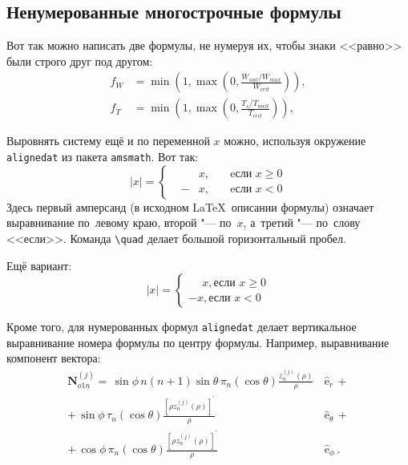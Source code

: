 \subsection{Ненумерованные многострочные формулы}\label{subsec:ch1/sec3/sub2}

Вот так можно написать две формулы, не нумеруя их, чтобы знаки <<равно>> были
строго друг под другом:
\begin{align}
  f_W & =  \min \left( 1, \max \left( 0, \frac{W_{soil} / W_{max}}{W_{crit}} \right)  \right), \nonumber \\
  f_T & =  \min \left( 1, \max \left( 0, \frac{T_s / T_{melt}}{T_{crit}} \right)  \right), \nonumber
\end{align}

Выровнять систему ещё и по переменной \( x \) можно, используя окружение
\verb|alignedat| из пакета \verb|amsmath|. Вот так:
\[
    |x| = \left\{
    \begin{alignedat}{2}
        &&x, \quad &\text{eсли } x\geqslant 0 \\
        &-&x, \quad & \text{eсли } x<0
    \end{alignedat}
    \right.
\]
Здесь первый амперсанд (в исходном \LaTeX\ описании формулы) означает
выравнивание по~левому краю, второй "--- по~\( x \), а~третий "--- по~слову
<<если>>. Команда \verb|\quad| делает большой горизонтальный пробел.

Ещё вариант:
\[
    |x|=
    \begin{cases}
    \phantom{-}x, \text{если } x \geqslant 0 \\
    -x, \text{если } x<0
    \end{cases}
\]

Кроме того, для  нумерованных формул \verb|alignedat| делает вертикальное
выравнивание номера формулы по центру формулы. Например, выравнивание
компонент вектора:
\begin{equation}
\label{eq:2p3}
\begin{alignedat}{2}
{\mathbf{N}}_{o1n}^{(j)} = \,{\sin} \phi\,n\!\left(n+1\right)
         {\sin}\theta\,
         \pi_n\!\left({\cos} \theta\right)
         \frac{
               z_n^{(j)}\!\left( \rho \right)
              }{\rho}\,
           &{\boldsymbol{\hat{\mathrm e}}}_{r}\,+   \\
+\,
{\sin} \phi\,
         \tau_n\!\left({\cos} \theta\right)
         \frac{
            \left[\rho z_n^{(j)}\!\left( \rho \right)\right]^{\prime}
              }{\rho}\,
            &{\boldsymbol{\hat{\mathrm e}}}_{\theta}\,+   \\
+\,
{\cos} \phi\,
         \pi_n\!\left({\cos} \theta\right)
         \frac{
            \left[\rho z_n^{(j)}\!\left( \rho \right)\right]^{\prime}
              }{\rho}\,
            &{\boldsymbol{\hat{\mathrm e}}}_{\phi}\:.
\end{alignedat}
\end{equation}

